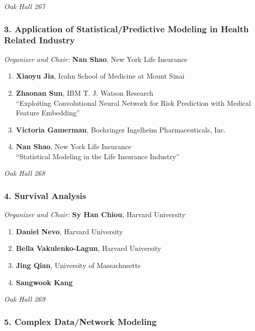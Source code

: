 \emph{Oak Hall 267} \\[.5em]

\subsubsection*{3. Application of Statistical/Predictive Modeling in Health Related Industry}

\emph{Organizer and Chair:} \textbf{Nan Shao}, New York Life Insurance

\begin{enumerate}
\item \textbf{Xiaoyu Jia}, Icahn School of Medicine at Mount Sinai 
\item \textbf{Zhaonan Sun}, IBM T. J. Watson Research \\
``Exploiting Convolutional Neural Network for Risk Prediction with Medical Feature Embedding''
\item \textbf{Victoria Gamerman}, Boehringer Ingelheim Pharmaceuticals, Inc. 
\item \textbf{Nan Shao}, New York Life Insurance \\
``Statistical Modeling in the Life Insurance Industry''
\end{enumerate}

\emph{Oak Hall 268} \\[.5em]

\subsubsection*{4. Survival Analysis}

\emph{Organizer and Chair:} \textbf{Sy Han Chiou}, Harvard University

\begin{enumerate}
\item \textbf{Daniel Nevo}, Harvard University 
\item \textbf{Bella Vakulenko-Lagun}, Harvard University 
\item \textbf{Jing Qian}, University of Massachusetts 
\item \textbf{Sangwook Kang} 
\end{enumerate}

\emph{Oak Hall 269} \\[.5em]

\subsubsection*{5. Complex Data/Network Modeling}

